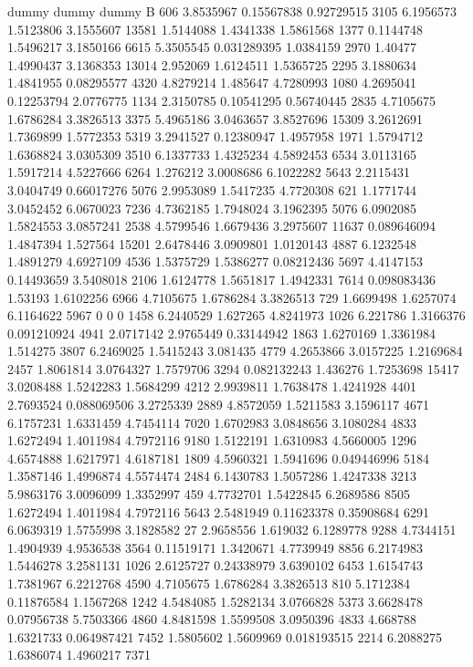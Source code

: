 dummy
dummy
dummy
B   606
3.8535967 0.15567838 0.92729515 3105
6.1956573 1.5123806 3.1555607 13581
1.5144088 1.4341338 1.5861568 1377
0.1144748 1.5496217 3.1850166 6615
5.3505545 0.031289395 1.0384159 2970
1.40477 1.4990437 3.1368353 13014
2.952069 1.6124511 1.5365725 2295
3.1880634 1.4841955 0.08295577 4320
4.8279214 1.485647 4.7280993 1080
4.2695041 0.12253794 2.0776775 1134
2.3150785 0.10541295 0.56740445 2835
4.7105675 1.6786284 3.3826513 3375
5.4965186 3.0463657 3.8527696 15309
3.2612691 1.7369899 1.5772353 5319
3.2941527 0.12380947 1.4957958 1971
1.5794712 1.6368824 3.0305309 3510
6.1337733 1.4325234 4.5892453 6534
3.0113165 1.5917214 4.5227666 6264
1.276212 3.0008686 6.1022282 5643
2.2115431 3.0404749 0.66017276 5076
2.9953089 1.5417235 4.7720308 621
1.1771744 3.0452452 6.0670023 7236
4.7362185 1.7948024 3.1962395 5076
6.0902085 1.5824553 3.0857241 2538
4.5799546 1.6679436 3.2975607 11637
0.089646094 1.4847394 1.527564 15201
2.6478446 3.0909801 1.0120143 4887
6.1232548 1.4891279 4.6927109 4536
1.5375729 1.5386277 0.08212436 5697
4.4147153 0.14493659 3.5408018 2106
1.6124778 1.5651817 1.4942331 7614
0.098083436 1.53193 1.6102256 6966
4.7105675 1.6786284 3.3826513 729
1.6699498 1.6257074 6.1164622 5967
0 0 0 1458
6.2440529 1.627265 4.8241973 1026
6.221786 1.3166376 0.091210924 4941
2.0717142 2.9765449 0.33144942 1863
1.6270169 1.3361984 1.514275 3807
6.2469025 1.5415243 3.081435 4779
4.2653866 3.0157225 1.2169684 2457
1.8061814 3.0764327 1.7579706 3294
0.082132243 1.436276 1.7253698 15417
3.0208488 1.5242283 1.5684299 4212
2.9939811 1.7638478 1.4241928 4401
2.7693524 0.088069506 3.2725339 2889
4.8572059 1.5211583 3.1596117 4671
6.1757231 1.6331459 4.7454114 7020
1.6702983 3.0848656 3.1080284 4833
1.6272494 1.4011984 4.7972116 9180
1.5122191 1.6310983 4.5660005 1296
4.6574888 1.6217971 4.6187181 1809
4.5960321 1.5941696 0.049446996 5184
1.3587146 1.4996874 4.5574474 2484
6.1430783 1.5057286 1.4247338 3213
5.9863176 3.0096099 1.3352997 459
4.7732701 1.5422845 6.2689586 8505
1.6272494 1.4011984 4.7972116 5643
2.5481949 0.11623378 0.35908684 6291
6.0639319 1.5755998 3.1828582 27
2.9658556 1.619032 6.1289778 9288
4.7344151 1.4904939 4.9536538 3564
0.11519171 1.3420671 4.7739949 8856
6.2174983 1.5446278 3.2581131 1026
2.6125727 0.24338979 3.6390102 6453
1.6154743 1.7381967 6.2212768 4590
4.7105675 1.6786284 3.3826513 810
5.1712384 0.11876584 1.1567268 1242
4.5484085 1.5282134 3.0766828 5373
3.6628478 0.07956738 5.7503366 4860
4.8481598 1.5599508 3.0950396 4833
4.668788 1.6321733 0.064987421 7452
1.5805602 1.5609969 0.018193515 2214
6.2088275 1.6386074 1.4960217 7371
